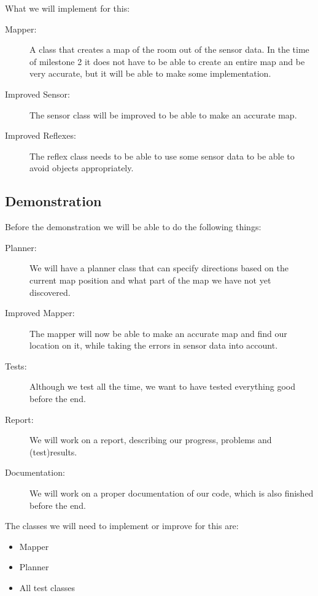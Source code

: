 What we will implement for this:
\begin{description}
\item[Mapper:] A class that creates a map of the room out of the sensor
data. In the time of milestone 2 it does not have to be able to create an entire
map and be very accurate, but it will be able to make some implementation.
\item[Improved Sensor:] The sensor class will be improved to be able to make
an accurate map.
\item[Improved Reflexes:] The reflex class needs to be able to use some
sensor data to be able to avoid objects appropriately. 
\end{description}


\subsection*{Demonstration}
Before the demonstration we will be able to do the following things:
\begin{description}
\item[Planner:] We will have a planner class that can specify directions
based on the current map position and what part of the map we have not yet
discovered.
\item[Improved Mapper:] The mapper will now be able to make an accurate map
and find our location on it, while taking the errors in sensor data into account.
\item[Tests:] Although we test all the time, we want to have tested
everything good before the end.
\item[Report:] We will work on a report, describing our progress, problems
and (test)results.
\item[Documentation:] We will work on a proper documentation of our code,
which is also finished before the end.
\end{description}

The classes we will need to implement or improve for this are:
\begin{itemize}
\item Mapper
\item Planner
\item All test classes
\end{itemize}

